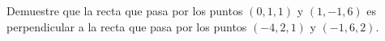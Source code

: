 \item Demuestre que la recta que pasa por los puntos $(0, 1, 1)$ y $(1, -1, 6)$ es perpendicular a la recta que pasa por los puntos $(-4, 2, 1)$ y $(-1, 6, 2)$.
